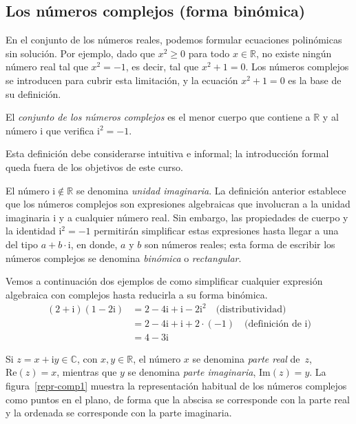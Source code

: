 \subsection{Los números complejos (forma binómica)}

En el conjunto de los números reales, podemos formular ecuaciones polinómicas sin solución.
Por ejemplo, dado que $x^2\ge 0$ para todo $x\in\mathbb{R}$, no existe ningún número real tal que $x^2=-1$, es decir, tal que $x^2+1=0$.
Los números complejos se introducen para cubrir esta limitación, y la ecuación $x^2+1=0$ es la base de su definición.

\begin{definicion}
El \emph{conjunto de los números complejos} es el menor cuerpo que contiene a $\mathbb{R}$ y al número $\mathrm{i}$ que verifica $\mathrm{i}^2=-1$.
\end{definicion}

Esta definición debe considerarse intuitiva e informal; la introducción formal queda fuera de los objetivos de este curso.

El número $\mathrm{i}\not\in\mathbb{R}$ se denomina \emph{unidad imaginaria}.
La definición anterior establece que los números complejos son expresiones algebraicas que involucran a la unidad imaginaria $\mathrm{i}$ y a cualquier número real.
Sin embargo, las propiedades de cuerpo y la identidad $\mathrm{i}^2=-1$ permitirán simplificar estas expresiones hasta llegar a una del tipo $a+b\cdot\mathrm{i}$, en donde, $a$ y $b$ son números reales;
esta forma de escribir los números complejos se denomina \emph{binómica} o \emph{rectangular}.


\begin{ejemplo}
Vemos a continuación dos ejemplos de como simplificar cualquier expresión algebraica con complejos hasta reducirla a su forma binómica.
\begin{align*}
(2+\mathrm{i})(1-2\mathrm{i}) & = 2 - 4\mathrm{i}+\mathrm{i}-2\mathrm{i}^2 \quad \text{(distributividad)}\\
& = 2 - 4\mathrm{i}+\mathrm{i}+2\cdot(-1) \quad \text{(definición de $\mathrm{i}$)}\\
& = 4 - 3\mathrm{i}
\end{align*}
\end{ejemplo}

Si $z=x+\mathrm{i} y\in\mathbb{C}$, con $x,y\in\mathbb{R}$, el número $x$ se denomina \emph{parte real} de~$z$, $\mathrm{Re}(z)=x$, mientras que $y$ se denomina \emph{parte imaginaria}, $\mathrm{Im}(z)=y$.
La figura~\ref{repr-comp1} muestra la representación habitual de los números complejos como puntos en el plano, de forma que la abscisa se corresponde con la parte real y la ordenada se corresponde con la parte imaginaria.

